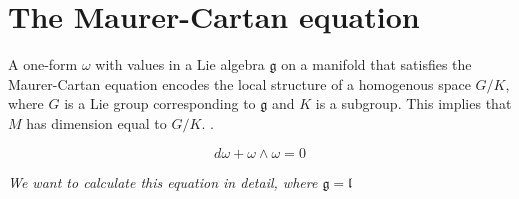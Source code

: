 \documentclass{article}
\newcommand{\lorentz}{\mathfrak{l}}
\newcommand{\g}{\mathfrak{g}}
\begin{document}
\section{The Maurer-Cartan equation}

A one-form $\omega$ with values in a Lie algebra $\g$ on a manifold that satisfies the Maurer-Cartan equation encodes the local structure of a homogenous space $G/K$, where $G$ is a Lie group corresponding to $\g$ and $K$ is a subgroup.
This implies that $M$ has dimension equal to $G/K$. \cite{thorne_cartan}.

$$ d \omega + \omega \wedge \omega = 0 $$

\emph{We want to calculate this equation in detail, where $\g=\lorentz$}
\end{document}
